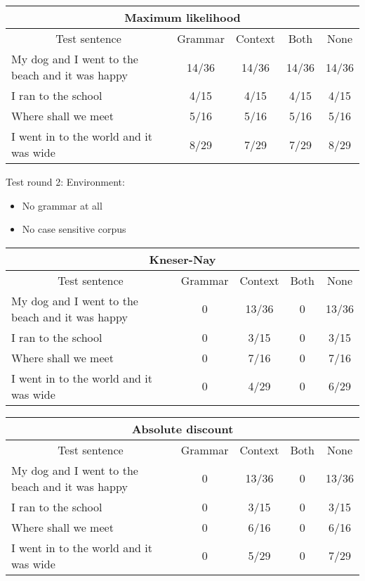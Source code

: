 \begin{table}[ht]
{\footnotesize
\begin{tabular}{ |p{}|c|c|c|c| }
	\hline
	\multicolumn{5}{|c|}{Maximum likelihood} \\
	\hline
	\multicolumn{1}{|c|}{Test sentence} & Grammar & Context & Both & None \\
	\hline
	My dog and I went to the beach and it was happy & 14/36 & 14/36 & 14/36 & 14/36 \\
	\hline
	I ran to the school & 4/15 & 4/15 & 4/15 & 4/15 \\
	\hline
	Where shall we meet & 5/16 & 5/16 & 5/16 & 5/16 \\
	\hline
	I went in to the world and it was wide & 8/29 & 7/29 & 7/29 & 8/29 \\
	\hline
\end{tabular}
}

Test round 2:
Environment:
\begin{itemize}
\item No grammar at all
\item No case sensitive corpus
\end{itemize}


{\footnotesize
\begin{tabular}{ |p{}|c|c|c|c| }
	\hline
	\multicolumn{5}{|c|}{Kneser-Nay} \\
	\hline
	\multicolumn{1}{|c|}{Test sentence} & Grammar & Context & Both & None \\
	\hline
	My dog and I went to the beach and it was happy & 0 & 13/36 & 0 & 13/36 \\
	\hline
	I ran to the school & 0 & 3/15 & 0 & 3/15 \\
	\hline
	Where shall we meet & 0 & 7/16 & 0 & 7/16 \\
	\hline
	I went in to the world and it was wide & 0 & 4/29 & 0 & 6/29 \\
	\hline
\end{tabular}
}

{\footnotesize
\begin{tabular}{ |p{}|c|c|c|c| }
	\hline
	\multicolumn{5}{|c|}{Absolute discount} \\
	\hline
	\multicolumn{1}{|c|}{Test sentence} & Grammar & Context & Both & None \\
	\hline
	My dog and I went to the beach and it was happy & 0 & 13/36 & 0 & 13/36 \\
	\hline
	I ran to the school & 0 & 3/15 & 0 & 3/15 \\
	\hline
	Where shall we meet & 0 & 6/16 & 0 & 6/16 \\
	\hline
	I went in to the world and it was wide & 0 & 5/29 & 0 & 7/29 \\
	\hline
\end{tabular}
}


\end{table}
